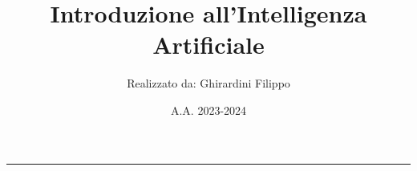 \documentclass[a4paper,10pt]{article}
\title{\textbf{Introduzione all'Intelligenza Artificiale}}
\author{Realizzato da: Ghirardini Filippo}
\date{A.A. 2023-2024}
\theoremstyle{remark}
\theoremstyle{definition}
\theoremstyle{plain}
\theoremstyle{definition}
\theoremstyle{definition}
\theoremstyle{definition}
\theoremstyle{plain}
\theoremstyle{plain}
\begin{document}
	
	
	\tableofcontents
	\newpage
	\maketitle
	\begin{center}
		\vspace{-20pt}
		\rule{11cm}{.1pt} 
	\end{center}
	
\end{document}
